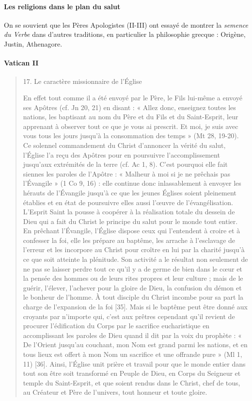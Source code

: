\paragraph{Les religions dans le plan du salut} On se souvient que les Pères Apologistes (II-III) ont essayé de montrer la \textit{semence du Verbe} dans d'autres traditions, en particulier la philosophie grecque : Origène, Justin, Athenagore. 

\paragraph{Vatican II}
\begin{quote}
    17. Le caractère missionnaire de l’Église

En effet tout comme il a été envoyé par le Père, le Fils lui-même a envoyé ses Apôtres (cf. Jn 20, 21) en disant : « Allez donc, enseignez toutes les nations, les baptisant au nom du Père et du Fils et du Saint-Esprit, leur apprenant à observer tout ce que je vous ai prescrit. Et moi, je suis avec vous tous les jours jusqu’à la consommation des temps » (Mt 28, 19-20). Ce solennel commandement du Christ d’annoncer la vérité du salut, l’Église l’a reçu des Apôtres pour en poursuivre l’accomplissement jusqu’aux extrémités de la terre (cf. Ac 1, 8). C’est pourquoi elle fait siennes les paroles de l’Apôtre : « Malheur à moi si je ne prêchais pas l’Évangile » (1 Co 9, 16) : elle continue donc inlassablement à envoyer les hérauts de l’Évangile jusqu’à ce que les jeunes Églises soient pleinement établies et en état de poursuivre elles aussi l’œuvre de l’évangélisation. L’Esprit Saint la pousse à coopérer à la réalisation totale du dessein de Dieu qui a fait du Christ le principe du salut pour le monde tout entier. En prêchant l’Évangile, l’Église dispose ceux qui l’entendent à croire et à confesser la foi, elle les prépare au baptême, les arrache à l’esclavage de l’erreur et les incorpore au Christ pour croître en lui par la charité jusqu’à ce que soit atteinte la plénitude. Son activité a le résultat non seulement de ne pas se laisser perdre tout ce qu’il y a de germe de bien dans le cœur et la pensée des hommes ou de leurs rites propres et leur culture ; mais de le guérir, l’élever, l’achever pour la gloire de Dieu, la confusion du démon et le bonheur de l’homme. À tout disciple du Christ incombe pour sa part la charge de l’expansion de la foi [35]. Mais si le baptême peut être donné aux croyants par n’importe qui, c’est aux prêtres cependant qu’il revient de procurer l’édification du Corps par le sacrifice eucharistique en accomplissant les paroles de Dieu quand il dit par la voix du prophète : « De l’Orient jusqu’au couchant, mon Nom est grand parmi les nations, et en tous lieux est offert à mon Nom un sacrifice et une offrande pure » (Ml 1, 11) [36]. Ainsi, l’Église unit prière et travail pour que le monde entier dans tout son être soit transformé en Peuple de Dieu, en Corps du Seigneur et temple du Saint-Esprit, et que soient rendus dans le Christ, chef de tous, au Créateur et Père de l’univers, tout honneur et toute gloire.
\end{quote}


